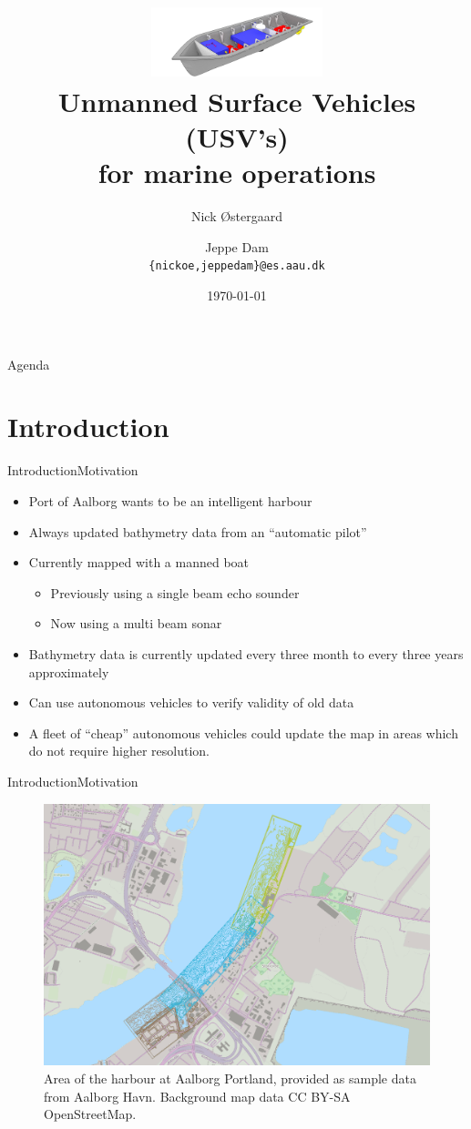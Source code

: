 \documentclass[10pt,handout]{beamer}
\title[USV's for marine operations]%
{\includegraphics[width=5cm]{../thesis/frontmatter/aauship}\\ Unmanned Surface Vehicles (USV's)\\ for marine operations}
\author[14gr1034]{%
  Nick Østergaard \and Jeppe Dam\\
  {{\tt \{nickoe,jeppedam\}@es.aau.dk}}
}
\institute[
  Dept.\ of Electronic Systems,\\
  Aalborg University,\\
  Denmark
] %
{%
  Department of Electronic Systems,\\
  Aalborg University,\\
  Denmark
  
}
\date{\today}
\begin{document}
\begin{frame}[plain] %
  \titlepage
\end{frame}

\begin{frame}{Agenda}{}
\tableofcontents
\end{frame}
\section{Introduction}
\begin{frame}{Introduction}{Motivation}
  \begin{itemize}
    \item Port of Aalborg wants to be an intelligent harbour
    \item Always updated bathymetry data from an ``automatic pilot''
    \item Currently mapped with a manned boat
    \begin{itemize}
      \item Previously using a single beam echo sounder
      \item Now using a multi beam sonar
    \end{itemize}
    \item Bathymetry data is currently updated every three month to every three years approximately
    \item Can use autonomous vehicles to verify validity of old data
    \item A fleet of ``cheap'' autonomous vehicles could update the map in areas which do not require higher resolution.
  \end{itemize}
\end{frame}

\begin{frame}{Introduction}{Motivation}
  \begin{figure}
	  \includegraphics[width=\textwidth]{../thesis/fig/use-case-data}
	  \caption{\scriptsize Area of the harbour at Aalborg Portland, provided as sample
	  data from Aalborg Havn. Background map data CC BY-SA OpenStreetMap.}
  \end{figure}
\end{frame}
\end{document}
